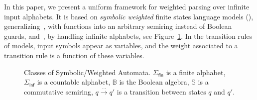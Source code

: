 In this paper, we present a uniform framework for weighted parsing over infinite input alphabets.
It is based on \emph{symbolic weighted} finite states language models (\swM), 
generalizing~\SA, with functions into an arbitrary semiring instead of Boolean guards, 
and~\WA, by handling infinite alphabets, see Figure~\ref{fig:hierarchy}.
In the transition rules of \swM models, input symbols appear as variables, %
and the weight associated to a transition rule is a function of these variables.
%
\begin{figure}
\centering
{}
\caption{Classes of Symbolic/Weighted Automata. 
$\Sigma_\mathsf{fin}$ is a finite alphabet, 
$\Sigma_\mathsf{inf}$ is a countable alphabet, 
$\mathbb{B}$ is the Boolean algebra, 
$\mathbb{S}$ is a commutative semiring, 
$q \xrightarrow{\dots} q'$ is a transition between states $q$ and $q'$.}
\label{fig:hierarchy}  
\end{figure}
